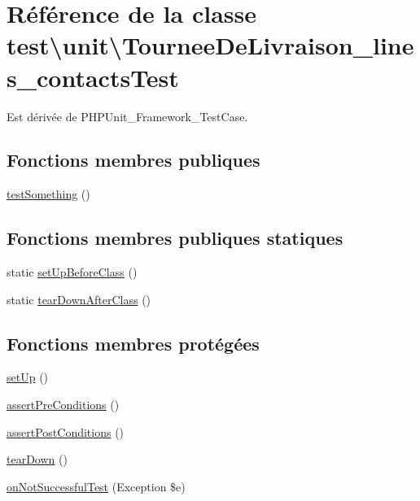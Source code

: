 \hypertarget{classtest_1_1unit_1_1TourneeDeLivraison__lines__contactsTest}{}\section{Référence de la classe test\textbackslash{}unit\textbackslash{}Tournee\+De\+Livraison\+\_\+lines\+\_\+contacts\+Test}
\label{classtest_1_1unit_1_1TourneeDeLivraison__lines__contactsTest}


Est dérivée de P\+H\+P\+Unit\+\_\+\+Framework\+\_\+\+Test\+Case.

\subsection*{Fonctions membres publiques}
\begin{DoxyCompactItemize}
\item 
\hyperlink{classtest_1_1unit_1_1TourneeDeLivraison__lines__contactsTest_a6d708605147f1cb7dd9611f07f44cc5a}{test\+Something} ()
\end{DoxyCompactItemize}
\subsection*{Fonctions membres publiques statiques}
\begin{DoxyCompactItemize}
\item 
static \hyperlink{classtest_1_1unit_1_1TourneeDeLivraison__lines__contactsTest_ab2b47298334b4e3b53bb0557c6bffc9d}{set\+Up\+Before\+Class} ()
\item 
static \hyperlink{classtest_1_1unit_1_1TourneeDeLivraison__lines__contactsTest_a917e2c7bd4e56fc0199d72bd4e225899}{tear\+Down\+After\+Class} ()
\end{DoxyCompactItemize}
\subsection*{Fonctions membres protégées}
\begin{DoxyCompactItemize}
\item 
\hyperlink{classtest_1_1unit_1_1TourneeDeLivraison__lines__contactsTest_ad35de89fffdb52fd2715f171a64ed032}{set\+Up} ()
\item 
\hyperlink{classtest_1_1unit_1_1TourneeDeLivraison__lines__contactsTest_a8e5defc1ca829fa18be3f7dfb501a3bc}{assert\+Pre\+Conditions} ()
\item 
\hyperlink{classtest_1_1unit_1_1TourneeDeLivraison__lines__contactsTest_a97fa6632a1617e95998c00fc23b3ecd2}{assert\+Post\+Conditions} ()
\item 
\hyperlink{classtest_1_1unit_1_1TourneeDeLivraison__lines__contactsTest_a13ec468dacb98712854bb1f9428a253c}{tear\+Down} ()
\item 
\hyperlink{classtest_1_1unit_1_1TourneeDeLivraison__lines__contactsTest_aa4344fda4dcb9c5d0240087af25bcf97}{on\+Not\+Successful\+Test} (Exception \$e)
\end{DoxyCompactItemize}


